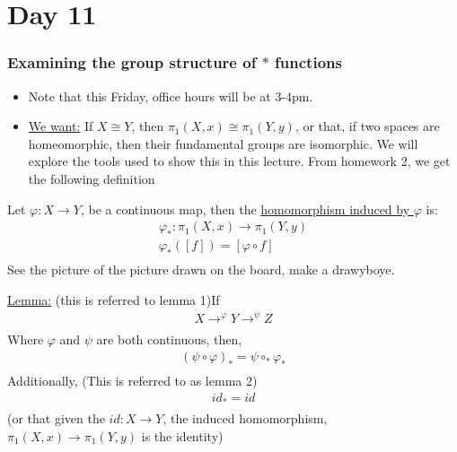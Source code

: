 \section{Day 11}
    \subsubsection{Examining the group structure of $*$ functions}
    \begin{itemize}
        \item Note that this Friday, office hours will be at 3-4pm.
        \item \underline{We want:} If $X\cong Y$, then $\pi_1(X,x)\cong \pi_1(Y,y)$,
            or that, if two spaces are homeomorphic, then their fundamental groups are isomorphic. We
            will explore the tools used to show this in this lecture. From homework 2, we get the following
            definition
    \end{itemize}
    \begin{definition}
        Let $\varphi: X\rightarrow Y$, be a continuous
        map, then the \underline{homomorphism induced by $\varphi$} is:
        \begin{align*}
            \varphi_{*}: \pi_1(X,x)\rightarrow \pi_1(Y,y)\\
            \varphi_{*}([f])=[\varphi\circ f]\\
        \end{align*}
        See the picture of the picture drawn on the board, make a drawyboye.
    \item \underline{Lemma:} (this is referred to lemma 1)If
        \begin{align*}
            X\rightarrow^{\varphi}Y\rightarrow^{\psi}Z\\
        \end{align*}
        Where $\varphi$ and $\psi$ are both continuous, then,
        \begin{align*}
            (\psi \circ \varphi)_{*}=\psi \circ_{*} \varphi_{*}\\
        \end{align*}
        Additionally, (This is referred to as lemma 2)
        \begin{align*}
            {id}_{*}=id\\
        \end{align*}
        (or that given the $id: X\rightarrow Y$, the induced homomorphism,
        $\pi_{1}(X,x)\rightarrow \pi_{1}(Y,y)$ is the identity)
    \end{definition}
